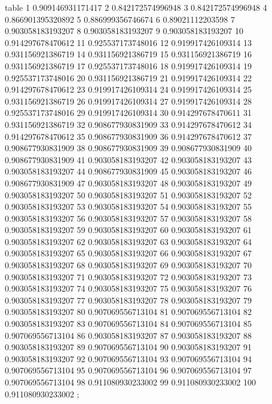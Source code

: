 table {%
	1 0.909146931171417
	2 0.842172574996948
	3 0.842172574996948
	4 0.866901395320892
	5 0.886999356746674
	6 0.89021112203598
	7 0.903058183193207
	8 0.903058183193207
	9 0.903058183193207
	10 0.914297678470612
	11 0.925537173748016
	12 0.919917426109314
	13 0.931156921386719
	14 0.931156921386719
	15 0.931156921386719
	16 0.931156921386719
	17 0.925537173748016
	18 0.919917426109314
	19 0.925537173748016
	20 0.931156921386719
	21 0.919917426109314
	22 0.914297678470612
	23 0.919917426109314
	24 0.919917426109314
	25 0.931156921386719
	26 0.919917426109314
	27 0.919917426109314
	28 0.925537173748016
	29 0.919917426109314
	30 0.914297678470611
	31 0.931156921386719
	32 0.908677930831909
	33 0.914297678470612
	34 0.914297678470612
	35 0.908677930831909
	36 0.914297678470612
	37 0.908677930831909
	38 0.908677930831909
	39 0.908677930831909
	40 0.908677930831909
	41 0.903058183193207
	42 0.903058183193207
	43 0.903058183193207
	44 0.908677930831909
	45 0.903058183193207
	46 0.908677930831909
	47 0.903058183193207
	48 0.903058183193207
	49 0.903058183193207
	50 0.903058183193207
	51 0.903058183193207
	52 0.903058183193207
	53 0.903058183193207
	54 0.903058183193207
	55 0.903058183193207
	56 0.903058183193207
	57 0.903058183193207
	58 0.903058183193207
	59 0.903058183193207
	60 0.903058183193207
	61 0.903058183193207
	62 0.903058183193207
	63 0.903058183193207
	64 0.903058183193207
	65 0.903058183193207
	66 0.903058183193207
	67 0.903058183193207
	68 0.903058183193207
	69 0.903058183193207
	70 0.903058183193207
	71 0.903058183193207
	72 0.903058183193207
	73 0.903058183193207
	74 0.903058183193207
	75 0.903058183193207
	76 0.903058183193207
	77 0.903058183193207
	78 0.903058183193207
	79 0.903058183193207
	80 0.907069556713104
	81 0.907069556713104
	82 0.903058183193207
	83 0.907069556713104
	84 0.907069556713104
	85 0.907069556713104
	86 0.903058183193207
	87 0.903058183193207
	88 0.903058183193207
	89 0.907069556713104
	90 0.903058183193207
	91 0.903058183193207
	92 0.907069556713104
	93 0.907069556713104
	94 0.907069556713104
	95 0.907069556713104
	96 0.907069556713104
	97 0.907069556713104
	98 0.911080930233002
	99 0.911080930233002
	100 0.911080930233002
};
